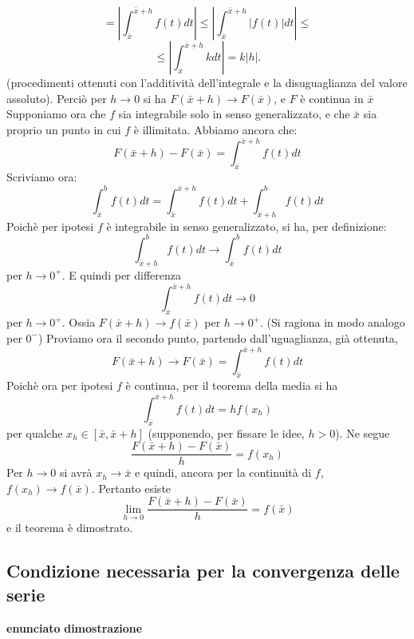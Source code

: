\documentclass[a4paper, 9pt]{report}
\begin{document}
\[
    = \left| \int_{\bar{x}}^{\bar{x}+h}f(t)dt \right|  \leq \left| \int_{\bar{x}}^{\bar{x}+h}|f(t)|dt \right| \leq
\]
\[
    \leq \left|\int_{\bar{x}}^{\bar{x}+h}kdt\right| = k|h|.
\]
(procedimenti ottenuti con l'additività dell'integrale e la disuguaglianza del valore assoluto). Perciò per $h \rightarrow 0$ si ha $F(\bar{x}+h) \rightarrow  F(\bar{x})$, e $F$ è continua in $\bar{x}$\newline
Supponiamo ora che $f$ sia integrabile solo in senso generalizzato, e che $\bar{x}$ sia proprio un punto in cui $f$ è illimitata. Abbiamo ancora che:
\[
    F(\bar{x}+h) -F(\bar{x}) = \int_{\bar{x}}^{\bar{x}+h}f(t) dt
\]
Scriviamo ora:
\[
    \int_{\bar{x}}^{b}f(t) dt = \int_{\bar{x}}^{\bar{x}+h}f(t) dt + \int_{\bar{x}+h}^{b}f(t) dt
\]
Poichè per ipotesi $f$ è integrabile in senso generalizzato, si ha, per definizione:
\[
    \int_{\bar{x}+h}^{b} f(t)dt \rightarrow \int_{\bar{x}}^{b}f(t) dt
\]
per $h \rightarrow 0^+$.\newline
E quindi per differenza 
\[
    \int_{\bar{x}}^{\bar{x}+h} f(t) dt \rightarrow 0
\]
per $h \rightarrow 0^+$. \newline
Ossia $F(\bar{x}+h) \rightarrow  f(\bar{x})$ per $h \rightarrow 0^+$. (Si ragiona in modo analogo per $0^-$)\newline
\newline
Proviamo ora il secondo punto, partendo dall'uguaglianza, già ottenuta, 
\[
    F(\bar{x}+h) \rightarrow F(\bar{x}) = \int_{\bar{x}}^{\bar{x}+h}f(t)dt
\]
Poichè ora per ipotesi $f$ è continua, per il teorema della media si ha 
\[
    \int_{\bar{x}}^{\bar{x}+h}f(t) dt = hf(x_h)
\]
per qualche $x_h \in[\bar{x},\bar{x}+h]$ (supponendo, per fissare le idee, $h>0$). Ne segue 
\[
    \frac{F(\bar{x}+h)- F(\bar{x})}{h} = f(x_h)
\]
Per $h \rightarrow 0$ si avrà $x_h \rightarrow \bar{x}$ e quindi, ancora per la continuità di $f$, $f(x_h) \rightarrow f(\bar{x})$. Pertanto esiste 
\[
    \lim_{h\rightarrow 0} \frac{F(\bar{x}+h) - F(\bar{x})}{h}= f(\bar{x})
\]
e il teorema è dimostrato.






\newpage
\subsection*{Condizione necessaria per la convergenza delle serie}\textbf{enunciato}\newline
\textbf{dimostrazione}\newline
\end{document}
